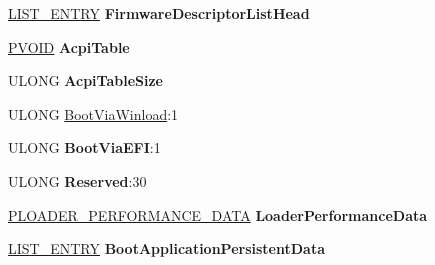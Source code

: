 \begin{DoxyCompactItemize}
\item 
\mbox{\label{struct___l_o_a_d_e_r___p_a_r_a_m_e_t_e_r___e_x_t_e_n_s_i_o_n_ab6008af249bba99d48d48e3213fde5fe}} 
\hyperlink{struct___l_i_s_t___e_n_t_r_y}{L\+I\+S\+T\+\_\+\+E\+N\+T\+RY} {\bfseries Firmware\+Descriptor\+List\+Head}
\item 
\mbox{\label{struct___l_o_a_d_e_r___p_a_r_a_m_e_t_e_r___e_x_t_e_n_s_i_o_n_a8bb7f826501e09e9cdc79bc149f41d05}} 
\hyperlink{interfacevoid}{P\+V\+O\+ID} {\bfseries Acpi\+Table}
\item 
\mbox{\label{struct___l_o_a_d_e_r___p_a_r_a_m_e_t_e_r___e_x_t_e_n_s_i_o_n_a1b6bfa13dff41bd905f0cc4900eee51b}} 
U\+L\+O\+NG {\bfseries Acpi\+Table\+Size}
\item 
U\+L\+O\+NG \hyperlink{struct___l_o_a_d_e_r___p_a_r_a_m_e_t_e_r___e_x_t_e_n_s_i_o_n_a3bb7b7c1db4a93520de8ee233ea97fe5}{Boot\+Via\+Winload}\+:1
\item 
\mbox{\label{struct___l_o_a_d_e_r___p_a_r_a_m_e_t_e_r___e_x_t_e_n_s_i_o_n_a0e43c166cb0f9af74c8b0060190718ec}} 
U\+L\+O\+NG {\bfseries Boot\+Via\+E\+FI}\+:1
\item 
\mbox{\label{struct___l_o_a_d_e_r___p_a_r_a_m_e_t_e_r___e_x_t_e_n_s_i_o_n_a4707277af67d4e1b93b3d334e63eb1bd}} 
U\+L\+O\+NG {\bfseries Reserved}\+:30
\item 
\mbox{\label{struct___l_o_a_d_e_r___p_a_r_a_m_e_t_e_r___e_x_t_e_n_s_i_o_n_a4f346d1def017ed49f5c1df3192eb186}} 
\hyperlink{struct___l_o_a_d_e_r___p_e_r_f_o_r_m_a_n_c_e___d_a_t_a}{P\+L\+O\+A\+D\+E\+R\+\_\+\+P\+E\+R\+F\+O\+R\+M\+A\+N\+C\+E\+\_\+\+D\+A\+TA} {\bfseries Loader\+Performance\+Data}
\item 
\mbox{\label{struct___l_o_a_d_e_r___p_a_r_a_m_e_t_e_r___e_x_t_e_n_s_i_o_n_a9d60f46cd3d68d8ac404c38e90d8bee6}} 
\hyperlink{struct___l_i_s_t___e_n_t_r_y}{L\+I\+S\+T\+\_\+\+E\+N\+T\+RY} {\bfseries Boot\+Application\+Persistent\+Data}

\end{DoxyCompactItemize}
